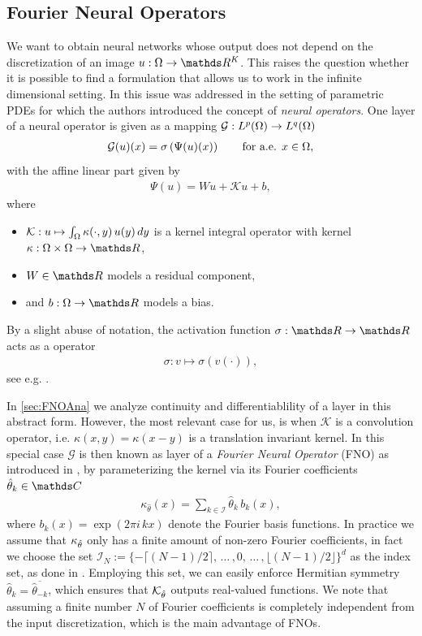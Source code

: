 \subsection{Fourier Neural Operators}
%
%
We want to obtain neural networks whose output does not depend on the discretization of an image $\img:\domain\to\R^K$. This raises the question whether it is possible to find a formulation that allows us to work in the infinite dimensional setting. In \cite{kovachki2021neural} this issue was addressed in the setting of parametric PDEs for which the authors introduced the concept of \emph{neural operators}. One layer of a neural operator is given as a mapping $\mathcal{G}:  L^p(\Omega) \rightarrow L^q(\Omega)$
%
\begin{align}\label{eq:layerdef}
\mathcal{G}(u)(x) = \sigma\left(\Psi(u)(x)\right) \qquad \text{for a.e. } x \in \Omega,
\end{align}
%
with the affine linear part given by
%
\begin{align}\label{eq:linearpart}
\Psi(u) = W u + \mathcal{K}u + b,
\end{align}
%
where
%
\begin{itemize}
\item $\mathcal{K}: u \mapsto \int_{\Omega} \kappa(\cdot, y)\, u(y)\,dy$ is a kernel integral operator with kernel $\kappa: \domain \times \domain \rightarrow \R$,
\item $W \in \R$ models a residual component,
\item and $b: \domain \rightarrow \R$ models a bias.
\end{itemize}
%
%
By a slight abuse of notation, the activation function $\sigma:\R\to\R$ acts as a \Nem operator
%
\begin{align}\label{eq:nemytskii}%
\sigma: v \mapsto \sigma(v(\cdot)),
\end{align}
%
see e.g. \cite{tröltzsch}.

In \cref{sec:FNOAna} we analyze continuity and differentiablility of a layer in this abstract form. However, the most relevant case for us, is when $\mathcal{K}$ is a convolution operator, i.e. $\kappa(x,y)=\kappa(x-y)$ is a translation invariant kernel. In this special case $\mathcal{G}$ is then known as layer of a \emph{Fourier Neural Operator} (FNO) as introduced in \cite{li2020fourier}, by parameterizing the kernel via its Fourier coefficients $\hat{\param}_k\in\C$
%
\begin{align}\label{eq:fnokernel}
\kappa_{\hat{\theta}}(x) = \sum_{k \in \mathcal{I}} \hat{\theta}_k\, b_k(x),
\end{align}
%
where $b_k(x) = \exp{(2\pi i\, kx)}$ denote the Fourier basis functions. In practice we assume that $\kappa_{\hat{\theta}}$ only has a finite amount of non-zero Fourier coefficients, in fact we choose the set $\mathcal{I}_N := \lbrace -\lceil (N-1)/2\rceil, \,\hdots\,,0,\, \hdots\,, \lfloor (N-1)/2 \rfloor\rbrace^d$ as the index set, as done in \cite{li2020fourier}. Employing this set, we can easily enforce Hermitian symmetry $\hat{\theta}_k = \overline{\hat{\theta}_{-k}}$, which ensures that $\mathcal{K}_{\hat{\theta}}$ outputs real-valued functions. We note that assuming a finite number $N$ of Fourier coefficients is completely independent from the input discretization, which is the main advantage of FNOs.
%
%
